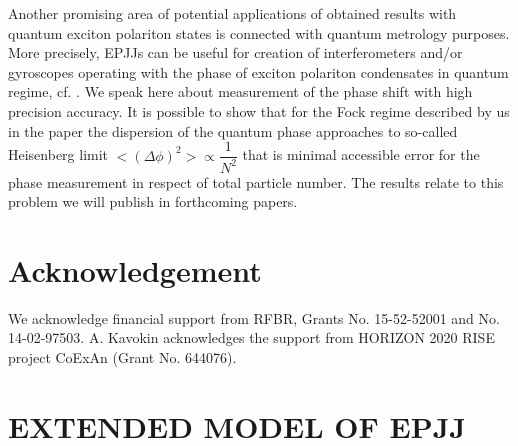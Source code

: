 \documentclass[aps, pre, preprint, groupedaddress, superscriptaddress, showkeys, showpacs] {revtex4-1}
\begin{document}
{{{Another promising area of potential applications of obtained results with quantum exciton polariton states is connected with quantum metrology purposes. More precisely, EPJJs can be useful for creation of interferometers and/or gyroscopes operating with the phase of  exciton polariton condensates in quantum regime, cf. \cite{Pezze, Gulevich}. We speak here about measurement of the phase shift with high precision accuracy. It is possible to show that for the Fock regime described by us in the paper the dispersion of the quantum phase approaches to so-called Heisenberg limit ${<(\Delta\phi)^2> \propto \dfrac{1}{N^2}}$ that is minimal accessible error for the phase measurement in respect of total particle number. The results relate to this problem we will publish in forthcoming papers. 

\section{Acknowledgement
\label{sec:acknowledgement}}
We acknowledge financial support from RFBR, Grants No. 15-52-52001 and No. 14-02-97503.
A. Kavokin acknowledges the support from HORIZON 2020 RISE project CoExAn (Grant No. 644076).

\appendix
\section{EXTENDED  MODEL OF EPJJ \label{sec:model}}

}}}
\end{document}
